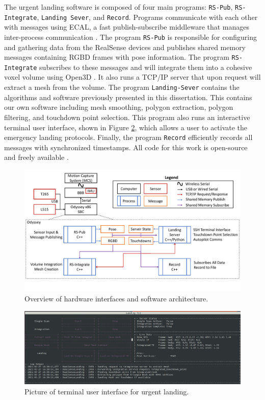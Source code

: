 The urgent landing software is composed of four main programs: \texttt{RS-Pub}, \texttt{RS-Integrate}, \texttt{Landing Sever}, and \texttt{Record}. Programs communicate with each other with messages using \ac{ECAL}, a fast publish-subscribe middleware that manages inter-process communication \cite{Continental_Github_ecal}. The program \texttt{RS-Pub} is responsible for configuring and gathering data from the RealSense devices and publishes shared memory messages containing \ac{RGBD} frames with pose information. The program \texttt{RS-Integrate} subscribes to these messages and will integrate them into a cohesive voxel volume using Open3D \cite{zhou_open3d_2018}. It also runs a TCP/IP server that upon request will extract a mesh from the volume. The program \texttt{Landing-Sever} contains the algorithms and software previously presented in this dissertation. This contains our own software including mesh smoothing, polygon extraction, polygon filtering, and touchdown point selection. This program also runs an interactive terminal user interface, shown in Figure \ref{fig:ch7_tui}, which allows a user to activate the emergency landing protocols. Finally, the program \texttt{Record} efficiently records all messages with synchronized timestamps. All code for this work is open-source and freely available \cite{Castagno_Github_realsensepackage}.

\begin{figure}[!tb]
    \centering  
    \includegraphics[page=1,clip,trim=0cm 0cm 0cm 0cm,width=.90\linewidth]{chapter_7_experiments/imgs/SoftwareOverview-v2.pdf}
    \caption[Overview of hardware interfaces and software architecture]{Overview of hardware interfaces and software architecture.}\label{fig:ch7_software}
\end{figure}

\begin{figure}[!tb]
    \centering  
    \includegraphics[page=1,clip,trim=0cm 0cm 0cm 0cm,width=.95\linewidth]{chapter_7_experiments/imgs/SensorPackage_TUI.pdf}
    \caption[Picture of terminal user interface for urgent landing]{Picture of terminal user interface for urgent landing.}\label{fig:ch7_tui}
\end{figure}

